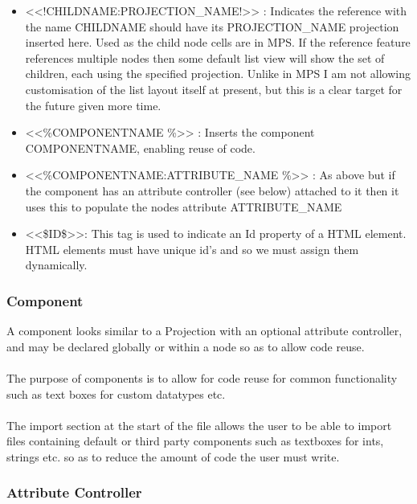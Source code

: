 \documentclass{article}
\begin{document}
\begin{itemize}
\item <<!CHILDNAME:PROJECTION\_NAME!>> : Indicates the reference with the name CHILDNAME should have its PROJECTION\_NAME projection inserted here. Used as the child node cells are in MPS. If the reference feature references multiple nodes then some default list view will show the set of children, each using the specified projection. Unlike in MPS I am not allowing customisation of the list layout itself at present, but this is a clear target for the future given more time.
\item <<\%COMPONENTNAME \%>> : Inserts the component COMPONENTNAME, enabling reuse of code.
\item <<\%COMPONENTNAME:ATTRIBUTE\_NAME \%>> : As above but if the component has an attribute controller (see below) attached to it then it uses this to populate the nodes attribute ATTRIBUTE\_NAME
\item <<\$ID\$>>: This tag is used to indicate an Id property of a HTML element. HTML elements must have unique id's and so we must assign them dynamically.
\end{itemize}

\subsubsection{Component}


A component looks similar to a  Projection with an optional attribute controller, and may be declared globally or within a node so as to allow code reuse.
\\
\\
The purpose of components is to allow for code reuse for common functionality such as text boxes for custom datatypes etc.
\\
\\
The import section at the start of the file allows the user to be able to import files containing default or third party components such as textboxes for ints, strings etc. so as to reduce the amount of code the user must write. 

\subsubsection{Attribute Controller}
\end{document}
